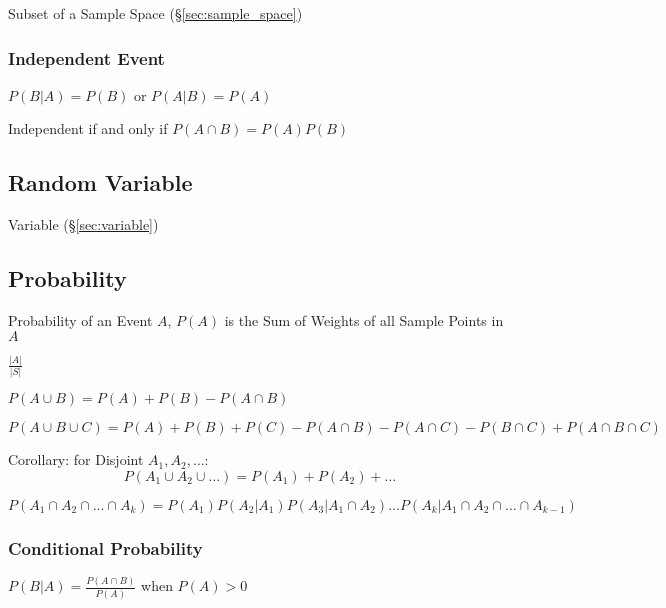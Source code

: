 Subset of a Sample Space (\S\ref{sec:sample_space})



\subsubsection{Independent Event}\label{sec:independent_event}

$P(B|A) = P(B)$ or $P(A|B) = P(A)$

Independent if and only if $P(A \cap B) = P(A) P(B)$



\subsection{Random Variable}\label{sec:random_variable}

Variable (\S\ref{sec:variable})



\subsection{Probability}\label{sec:probability}

Probability of an Event $A$, $P(A)$ is the Sum of Weights of all
Sample Points in $A$

$\frac{|A|}{|S|}$

$P(A \cup B) = P(A) + P(B) - P(A \cap B)$

$P(A \cup B \cup C) = P(A) + P(B) + P(C) - P(A \cap B) - P(A \cap C) -
P(B \cap C) + P(A \cap B \cap C)$

Corollary: for Disjoint $A_1, A_2, \ldots$:
\[
  P(A_1 \cup A_2 \cup \ldots) = P(A_1) + P(A_2) + \ldots
\]

$P(A_1 \cap A_2 \cap \ldots \cap A_k) = P(A_1) P(A_2 | A_1) P(A_3 |
A_1 \cap A_2) \ldots P(A_k | A_1 \cap A_2 \cap \ldots \cap A_{k-1})$



\subsubsection{Conditional Probability}
\label{sec:conditional_probability}

$P(B|A) = \frac{P(A \cap B)}{P(A)}$ when $P(A) > 0$

